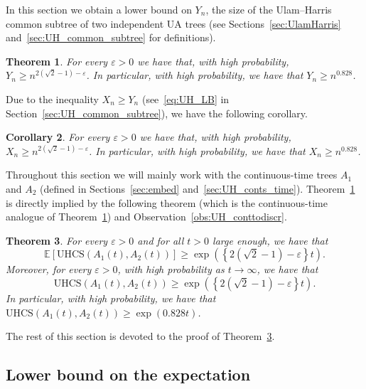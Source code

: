 \documentclass[11pt]{article}
\numberwithin{equation}{section}
\newcommand{\E}{\mathbb{E}} %
\newcommand{\eps}{\varepsilon} %
\newcommand{\UHCS}{\mathrm{UHCS}} %
\newtheorem{theorem}{Theorem}[section]
\newtheorem{corollary}[theorem]{Corollary}
\theoremstyle{definition}
\begin{document}
In this section we obtain a lower bound on $Y_{n}$, 
the size of the Ulam--Harris common subtree of two independent UA trees (see Sections~\ref{sec:UlamHarris} and~\ref{sec:UH_common_subtree} for definitions). 

\begin{theorem}\label{thm:UH_matching}
For every $\eps > 0$ we have that, with high probability, $Y_{n} \geq n^{2(\sqrt{2}-1)-\eps}$. 
In particular, with high probability, we have that $Y_{n} \geq n^{0.828}$. 
\end{theorem}

Due to the inequality $X_{n} \geq Y_{n}$ (see~\eqref{eq:UH_LB} in Section~\ref{sec:UH_common_subtree}), we have the following corollary. 

\begin{corollary}\label{thm:UHLB}
For every $\eps > 0$ we have that, with high probability, $X_{n} \geq n^{2(\sqrt{2}-1)-\eps}$. 
In particular, with high probability, we have that $X_{n} \geq n^{0.828}$. 
\end{corollary}

Throughout this section we will mainly work with the continuous-time trees $A_{1}$ and $A_{2}$ (defined in Sections~\ref{sec:embed} and~\ref{sec:UH_conts_time}). 
Theorem~\ref{thm:UH_matching} is directly implied by the following theorem (which is the continuous-time analogue of Theorem~\ref{thm:UH_matching}) and Observation~\ref{obs:UH_conttodiscr}. 

\begin{theorem}\label{thm:UH_matching_cts}
For every $\eps > 0$ and for all $t>0$ large enough, we have that 
\begin{equation}\label{eq:UH_expected}
\E \left[ \UHCS(A_{1}(t), A_{2}(t)) \right] 
\geq 
\exp \left( \left\{ 2 \left( \sqrt{2} - 1 \right) - \eps \right\} t \right).
\end{equation}
Moreover, for every $\eps > 0$, with high probability as $t\to \infty$, we have that 
\begin{equation}\label{eq:UH_highprob}
\UHCS(A_{1}(t), A_{2}(t)) 
\geq 
\exp \left( \left\{ 2 \left( \sqrt{2} - 1 \right) - \eps \right\} t \right).
\end{equation}
In particular, with high probability, we have that 
$\UHCS(A_{1}(t), A_{2}(t))
\geq \exp( 0.828 t )$. 
\end{theorem}
The rest of this section is devoted to the proof of Theorem~\ref{thm:UH_matching_cts}. 

\subsection{Lower bound on the expectation}\label{sec:UHLB_expectation}
\end{document}
